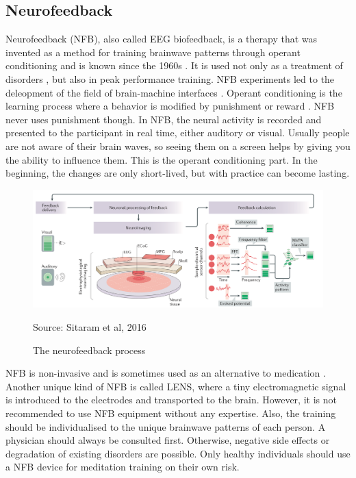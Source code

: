 \documentclass{llncs} %
\newcommand{\source}[1]{\hfill Source: {#1} }
\begin{document}
\subsection{Neurofeedback}
Neurofeedback (NFB), also called EEG biofeedback, is a therapy that was invented as a method for training brainwave patterns through operant conditioning and is known since the 1960s \cite{Hammond}. %
It is used not only as a treatment of disorders \cite{brand:del}, but also in peak performance training. NFB experiments led to the deleopment of the field of brain-machine interfaces \cite{Sitaram}.
Operant conditioning is the learning process where a behavior is modified by punishment or reward \cite{Spence}. NFB never uses punishment though. In NFB, the neural activity is recorded and presented to the participant in real time, either auditory or visual.  
Usually people are not aware of their brain waves, so seeing them on a screen helps by giving you the ability to influence them. This is the operant conditioning part. In the beginning, the changes are only short-lived, but with practice can become lasting. 

\begin{figure}
    \includegraphics[width=\linewidth]{Neurofeedback.png}
    \caption{The neurofeedback process}  \label{neurofeedback}
    \source{Sitaram et al, 2016}
\end{figure}

NFB is non-invasive and is sometimes used as an alternative to medication \cite{Hammond}. Another unique kind of NFB is called LENS, where a tiny electromagnetic signal is introduced to the electrodes and transported to the brain.
However, it is not recommended to use NFB equipment without any expertise. Also, the training should be individualised to the unique brainwave patterns of each person. A physician should always be consulted first.
Otherwise, negative side effects or degradation of existing disorders are possible. Only healthy individuals should use a NFB device for meditation training on their own risk.
\end{document}
